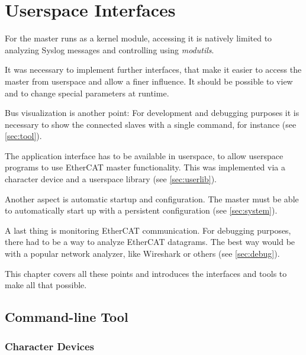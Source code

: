 \documentclass[a4paper,12pt,BCOR=6mm,bibtotoc,idxtotoc]{scrbook}
\begin{document}

\chapter{Userspace Interfaces}
\label{sec:user}

For the master runs as a kernel module, accessing it is natively limited to
analyzing Syslog messages and controlling using \textit{modutils}.

It was necessary to implement further interfaces, that make it easier to access
the master from userspace and allow a finer influence. It should be possible
to view and to change special parameters at runtime.

Bus visualization is another point: For development and debugging purposes it
is necessary to show the connected slaves with a single command, for instance
(see \autoref{sec:tool}).

The application interface has to be available in userspace, to allow userspace
programs to use EtherCAT master functionality. This was implemented via a
character device and a userspace library (see \autoref{sec:userlib}).

Another aspect is automatic startup and configuration. The master must be able
to automatically start up with a persistent configuration (see
\autoref{sec:system}).

A last thing is monitoring EtherCAT communication. For debugging purposes,
there had to be a way to analyze EtherCAT datagrams. The best way would be
with a popular network analyzer, like Wireshark \cite{wireshark} or others
(see \autoref{sec:debug}).

This chapter covers all these points and introduces the interfaces and tools
to make all that possible.


\section{Command-line Tool}
\label{sec:tool}


\subsection{Character Devices}
\label{sec:cdev}
\end{document}
